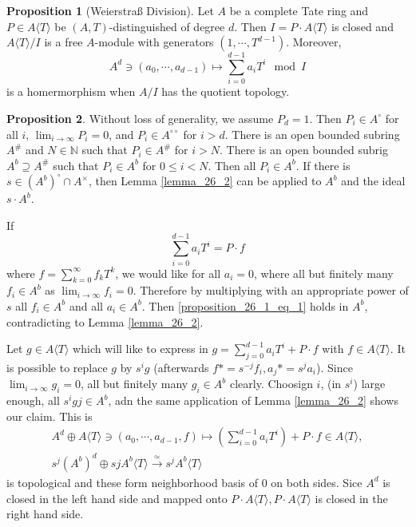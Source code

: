 \documentclass[10pt]{article}
\numberwithin{equation}{section}
\theoremstyle{definition}
\newtheorem{proposition}{Proposition}[subsection]
\newcommand{\N}[0]{\mathbb{N}}
\newcommand{\dcirc}[0]{{\circ\circ}}
\begin{document}
\begin{proposition}[Weierstraß Division]
    \label{proposition_26_1}
    Let $A$ be a complete Tate ring and $P\in A\langle T\rangle$ be $(A,T)$-distinguished of degree $d$. Then $I = P\cdot A\langle T\rangle$ is closed and $A\langle T\rangle/I$ is a free $A$-module with generators $(1,\cdots,T^{d-1})$. 
    Moreover, 
    \begin{equation*}
        A^d\ni (a_0,\cdots,a_{d-1})\mapsto \sum_{i=0}^{d-1}a_iT^i\mod{I}
    \end{equation*}
    is a homermorphism when $A/I$ has the quotient topology.
\end{proposition}
\begin{proposition}
    Without loss of generality, we assume $P_d=1$. Then $P_i\in A^\circ$ for all $i$, $\lim_{i\to \infty}P_i=0$, and $P_i\in A^\dcirc$ for $i>d$. 
    There is an open bounded subring $A^\#$ and $N\in\N$ such that $P_i\in A^\#$ for $i>N$. There is an open bounded subrig $A^b\supseteq A^\#$ such that $P_i\in A^b$ for $0\leq i<N$. Then all $P_i\in A^b$. If there is $s\in (A^b)^\circ\cap A^\times$, then Lemma \ref{lemma_26_2} can be applied to $A^b$ and the ideal $s\cdot A^b$. 
    \par If 
    \begin{equation*}
        \label{proposition_26_1_eq_1}
    \sum_{i=0}^{d-1}a_iT^i = P\cdot f\tag{$\dagger$}
    \end{equation*} where $f = \sum_{k=0}^\infty f_kT^k$, we would like for all $a_i=0$, where all but finitely many $f_i\in A^b$ as $\lim_{i\to\infty}f_i = 0$. Therefore by multiplying with an appropriate power of $s$ all $f_i\in A^b$ and all $a_i\in A^b$. Then \eqref{proposition_26_1_eq_1} holds in $A^b$, contradicting to Lemma \ref{lemma_26_2}. 
    \par Let $g\in A\langle T\rangle$ which will like to express in $g=\sum_{j=0}^{d-1}a_iT^i+P\cdot f$ with $f\in A\langle T\rangle$. It is possible to replace $g$ by $s^ig$ (afterwards $f\ast = s^{-j}f_i, a_j\ast = s^ja_i$). Since $\lim_{i\to\infty}g_i=0$, all but finitely many $g_i\in A^b$ clearly. 
    Choosign $i$, (in $s^i$) large enough, all $s^igj\in A^b$, adn the same application of Lemma \ref{lemma_26_2} shows our claim. This is 
    \begin{align*}
       A^d\oplus A\langle T\rangle \ni (a_0,\cdots,a_{d-1},f)\mapsto \left(\sum_{i=0}^{d-1}a_iT^i\right)+P\cdot f \in A\langle T\rangle,\\
       s^j(A^b)^d\oplus sjA^b\langle T\rangle \stackrel{\simeq}{\to}s^jA^b\langle T\rangle
    \end{align*}
    is topological and these form neighborhood basis of $0$ on both sides. Sice $A^d$ is closed in the left hand side and mapped onto $P\cdot A\langle T\rangle,P\cdot A\langle T\rangle$ is closed in the right hand side.
\end{proposition}
\end{document}
